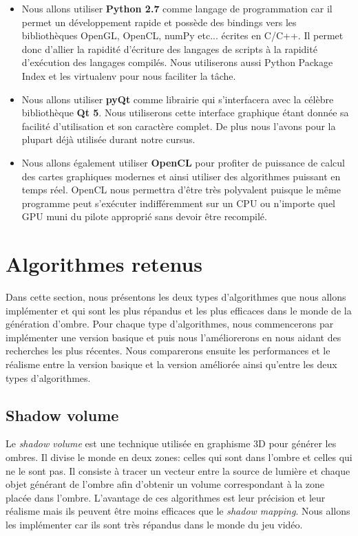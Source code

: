 \documentclass[a4paper,10pt]{report}
\begin{document}
\begin{itemize}
\item{Nous allons utiliser \textbf{Python 2.7} comme langage de programmation car il permet un développement rapide et possède des bindings vers les bibliothèques OpenGL, OpenCL, numPy etc... écrites en C/C++. Il permet donc d'allier la rapidité d'écriture des langages de scripts à la rapidité d'exécution des langages compilés. Nous utiliserons aussi Python Package Index et les virtualenv pour nous faciliter la t\^ache.}
\item{Nous allons utiliser \textbf{pyQt} comme librairie qui s'interfacera avec la célèbre bibliothèque \textbf{Qt 5}. Nous utiliserons cette interface graphique étant donnée sa facilité d'utilisation et son caractère complet. De plus nous l'avons pour la plupart déjà utilisée durant notre cursus.}
\item{Nous allons également utiliser \textbf{OpenCL} pour profiter de puissance de calcul des cartes graphiques modernes et ainsi utiliser des algorithmes puissant en temps réel. OpenCL nous permettra d'être très polyvalent puisque le même programme peut s'exécuter indifféremment sur un CPU ou n'importe quel GPU muni du pilote approprié sans devoir être recompilé.}
\end{itemize}

\section{Algorithmes retenus}

Dans cette section, nous présentons les deux types d'algorithmes que nous allons implémenter et qui sont les plus répandus et les plus efficaces dans le monde de la génération d'ombre. Pour chaque type d'algorithmes, nous commencerons par implémenter une version basique et puis nous l'améliorerons en nous aidant des recherches les plus récentes.
Nous comparerons ensuite les performances et le réalisme entre la version basique et la version améliorée ainsi qu'entre les deux types d'algorithmes.

\subsection{Shadow volume}
Le \textit{shadow volume} est une technique utilisée en graphisme 3D pour générer les ombres. Il divise le monde en deux zones: celles qui sont dans l'ombre et celles qui ne le sont pas. Il consiste à tracer un vecteur entre la source de lumière et chaque objet générant de l'ombre afin d'obtenir un volume correspondant à la zone placée dans l'ombre.
L'avantage de ces algorithmes est leur précision et leur réalisme mais ils peuvent être moins efficaces que le \textit{shadow mapping}. Nous allons les implémenter car ils sont très répandus dans le monde du jeu vidéo.
\end{document}
